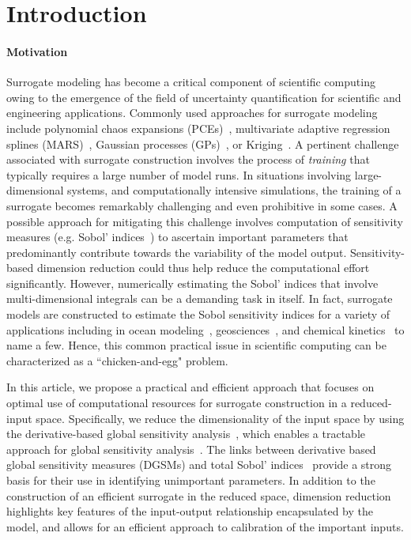 \section{Introduction}
\label{sec:intro}

\paragraph{Motivation}
Surrogate modeling has become a critical component of scientific computing
owing to the emergence of the field of uncertainty quantification for
scientific and engineering applications. Commonly used approaches for
surrogate modeling include polynomial chaos expansions
(PCEs)~\cite{Xiu:2002,Ghanem:2003,Olivier:2010}, multivariate adaptive
regression splines (MARS)~\cite{friedman93}, Gaussian processes
(GPs)~\cite{Rasmussen:2004}, or Kriging~\cite{Stein:2012}. A 
pertinent challenge associated with surrogate construction involves the
process of \textit{training} that typically requires a large number of model runs.
In situations involving large-dimensional systems,
and computationally intensive simulations, the training of a surrogate
becomes remarkably challenging and even prohibitive in some cases. A possible
approach for mitigating this challenge involves computation of sensitivity
measures (e.g. Sobol' indices~\cite{Sobol93,Sobol:2001,Owen13,SaltelliRattoAndresEtAl08})
to ascertain important parameters that predominantly contribute towards the variability
of the model output. Sensitivity-based dimension reduction could thus help
reduce the computational effort significantly. However, numerically estimating
the Sobol' indices that involve multi-dimensional integrals can be a demanding task
in itself. In fact, surrogate models are constructed to estimate the 
Sobol sensitivity indices for a variety of applications including in ocean 
modeling~\cite{AlexanderianWinokurSrajEtAl12,LiIskandaraniLeHenaffEtAl16},
geosciences~\cite{Namhata2016OladyshkinDilmoreEtAl16,deman2016,SaadAlexanderianPrudhommeEtAl17},
and chemical kinetics~\cite{DegasperiGilmore08,navarro2016global,Vohra:2014}
to name a few. Hence, this common practical issue in scientific computing can
be characterized as a ``chicken-and-egg" problem. 

In this article, we propose a practical and efficient approach that focuses on
optimal use of computational resources for surrogate construction in a 
reduced-input space. Specifically, we reduce the dimensionality of the
input space by using the derivative-based global sensitivity
analysis~\cite{Sobol:2009,Sobol:2010,Lamboni:2013,Kucherenko:2009,Kucherenko:2016},
which enables a tractable approach for global sensitivity
analysis~\cite{Kucherenko:2016}. The links between derivative based
global sensitivity measures (DGSMs) and total Sobol'
indices~\cite{Sobol:2009,Kucherenko:2009,Kucherenko:2016} provide a strong
basis for their use in identifying unimportant parameters. In addition
to the construction of an efficient surrogate in the reduced space,
dimension reduction highlights key features of the input-output relationship
encapsulated by the model, and allows for an efficient approach to calibration
of the important inputs. 

